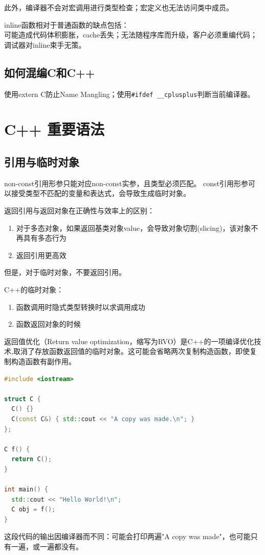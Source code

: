 此外，编译器不会对宏调用进行类型检查；宏定义也无法访问类中成员。

inline函数相对于普通函数的缺点包括：\\
可能造成代码体积膨胀，cache丢失；无法随程序库而升级，客户必须重编代码；调试器对inline束手无策。

\subsection{如何混编C和C++}
使用extern C防止Name Mangling；使用\verb$#ifdef __cplusplus$判断当前编译器。



\section{C++ 重要语法}


\subsection{引用与临时对象}
non-const引用形参只能对应non-const实参，且类型必须匹配。
const引用形参可以接受类型不匹配的变量和表达式，会导致生成临时对象。

返回引用与返回对象在正确性与效率上的区别：
\begin{enumerate}
  \item 对于多态对象，如果返回基类对象value，会导致对象切割(slicing)，该对象不再具有多态行为
  \item 返回引用更高效
\end{enumerate}
但是，对于临时对象，不要返回引用。

C++的临时对象：
\begin{enumerate}
\item 函数调用时隐式类型转换时以求调用成功
\item 函数返回对象的时候
\end{enumerate}

返回值优化（Return value optimization，缩写为RVO）是C++的一项编译优化技术,取消了存放函数返回值的临时对象。这可能会省略两次复制构造函数，即使复制构造函数有副作用。
\begin{lstlisting}[language=C++]
#include <iostream>
 
struct C {
  C() {}
  C(const C&) { std::cout << "A copy was made.\n"; }
};
 
C f() {
  return C();
}
 
int main() {
  std::cout << "Hello World!\n";
  C obj = f();
} 
\end{lstlisting}
这段代码的输出因编译器而不同：可能会打印两遍"A copy was made"，也可能只有一遍，或一遍都没有。

